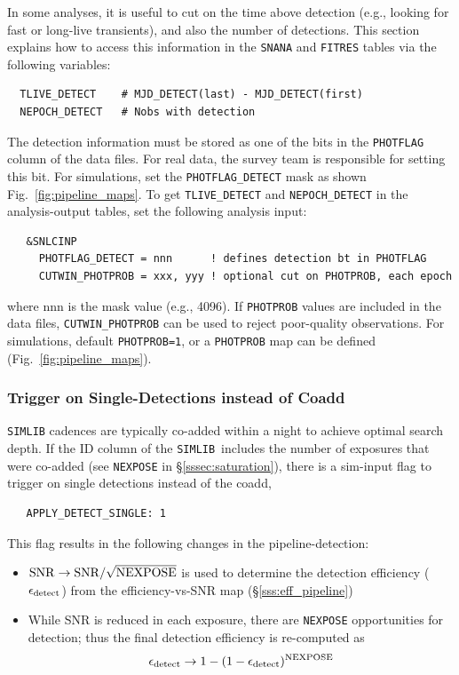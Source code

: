 \documentclass[12pt]{article}
\newcommand{\simlib}{{\tt SIMLIB}}
\newcommand{\simeffsub}{\epsilon_{\rm detect}}  %
\begin{document}
{In some analyses, it is useful to cut on the time above detection
(e.g., looking for fast or long-live transients), and also the
number of detections. This section explains how to access this
information in the {\tt SNANA} and {\tt FITRES} tables via
the following variables:
%
\begin{verbatim}
  TLIVE_DETECT    # MJD_DETECT(last) - MJD_DETECT(first)
  NEPOCH_DETECT   # Nobs with detection
\end{verbatim}
%
The detection information must be stored as one of the bits in the
{\tt PHOTFLAG} column of the data files. For real data, the survey
team is responsible for setting this bit. For simulations, set the
{\tt PHOTFLAG\_DETECT} mask as shown Fig.~\ref{fig:pipeline_maps}.
To get {\tt TLIVE\_DETECT} and {\tt NEPOCH\_DETECT} in the
analysis-output tables, set the following analysis input:
\begin{verbatim}                                                               
   &SNLCINP
     PHOTFLAG_DETECT = nnn      ! defines detection bt in PHOTFLAG
     CUTWIN_PHOTPROB = xxx, yyy ! optional cut on PHOTPROB, each epoch
\end{verbatim}                                                                
%
where nnn is the mask value (e.g., 4096).
If {\tt PHOTPROB} values are included in the data files,
{\tt CUTWIN\_PHOTPROB} can be used to reject poor-quality 
observations. For simulations, default {\tt PHOTPROB=1},
or a {\tt PHOTPROB} map can be defined (Fig.~\ref{fig:pipeline_maps}).

   \subsubsection{Trigger on Single-Detections instead of Coadd}
   \label{sssec:detect_single}

{\simlib} cadences are typically co-added within a night to achieve
optimal search depth. If the ID column of the \simlib\ includes
the number of exposures that were co-added 
(see {\tt NEXPOSE} in \S\ref{sssec:saturation}),
there is a sim-input flag to trigger on single detections instead
of the coadd,
\begin{verbatim}
   APPLY_DETECT_SINGLE: 1
\end{verbatim}
This flag results in the following changes in the pipeline-detection:
\begin{itemize}
   \item ${\rm SNR} \to {\rm SNR}/\sqrt{\rm NEXPOSE}$ is used to
      determine the detection efficiency ($\simeffsub$) 
      from the efficiency-vs-SNR map
      (\S\ref{sss:eff_pipeline})
   \item While SNR is reduced in each exposure, there are {\tt NEXPOSE}
      opportunities for detection; thus the final detection efficiency
      is re-computed as
  \begin{equation}
     \simeffsub \to 1 - (1-\simeffsub)^{\rm NEXPOSE}
  \end{equation}
\end{itemize}

}
\end{document}
